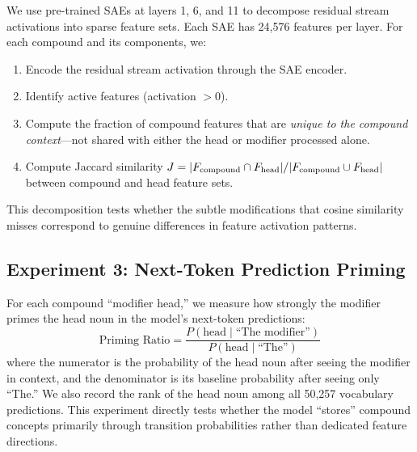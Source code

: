 We use pre-trained SAEs at layers 1, 6, and 11 to decompose residual stream activations into sparse feature sets.
Each SAE has 24,576 features per layer.
For each compound and its components, we:
\begin{enumerate}[leftmargin=*,itemsep=0pt,topsep=0pt]
    \item Encode the residual stream activation through the SAE encoder.
    \item Identify active features (activation $> 0$).
    \item Compute the fraction of compound features that are \emph{unique to the compound context}---not shared with either the head or modifier processed alone.
    \item Compute Jaccard similarity $J = |F_{\text{compound}} \cap F_{\text{head}}| / |F_{\text{compound}} \cup F_{\text{head}}|$ between compound and head feature sets.
\end{enumerate}

This decomposition tests whether the subtle modifications that cosine similarity misses correspond to genuine differences in feature activation patterns.

\subsection{Experiment 3: Next-Token Prediction Priming}
\label{sec:exp3}

For each compound ``modifier head,'' we measure how strongly the modifier primes the head noun in the model's next-token predictions:
\begin{equation}
    \text{Priming Ratio} = \frac{P(\text{head} \mid \text{``The modifier''})}{P(\text{head} \mid \text{``The''})}
    \label{eq:priming}
\end{equation}
where the numerator is the probability of the head noun after seeing the modifier in context, and the denominator is its baseline probability after seeing only ``The.''
We also record the rank of the head noun among all 50,257 vocabulary predictions.
This experiment directly tests whether the model ``stores'' compound concepts primarily through transition probabilities rather than dedicated feature directions.
